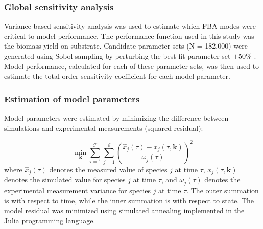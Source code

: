 \documentclass[10pt,twocolumn,twoside,final]{IEEEtran}
\begin{document}
\subsubsection*{Global sensitivity analysis}
Variance based sensitivity analysis was used to estimate which FBA modes were critical to model performance.
The performance function used in this study was the biomass yield on substrate.
Candidate parameter sets (N = 182,000) were generated using Sobol sampling by perturbing the best fit parameter set $\pm50\%$ \cite{SALib}.
Model performance, calculated for each of these parameter sets, was then used to estimate the total-order sensitivity coefficient for each model parameter.

\subsubsection*{Estimation of model parameters}
Model parameters were estimated by minimizing the difference between simulations and experimental measurements (squared residual):

\begin{equation}\label{eqn:objective-function}\nonumber
	\min_{\mathbf{k}} \sum_{\tau=1}^{\mathcal{T}}\sum_{j=1}^{\mathcal{S}}\left(\frac{\hat{x}_{j}\left(\tau\right) - x_{j}\left(\tau,\mathbf{k}\right)}{\omega_{j}\left(\tau\right)}\right)^{2}
\end{equation}
where $\hat{x}_{j}\left(\tau\right)$ denotes the measured value of species $j$ at time $\tau$, $x_{j}\left(\tau,\mathbf{k}\right)$ denotes the simulated
value for species $j$ at time $\tau$, and $\omega_{j}\left(\tau\right)$ denotes the experimental measurement variance for species $j$ at time $\tau$.
The outer summation is with respect to time, while the inner summation is with respect to state. The model residual was minimized using simulated annealing implemented in the Julia programming language.



\end{document}
